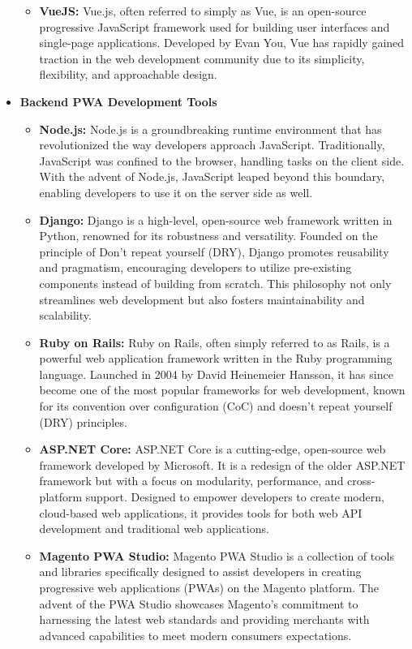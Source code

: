 \documentclass[12pt]{article}
\begin{document}
\begin{itemize}
\begin{itemize}
            \item \textbf{VueJS:} Vue.js, often referred to simply as Vue, is an open-source progressive JavaScript framework used for building user interfaces and single-page applications. Developed by Evan You, Vue has rapidly gained traction in the web development community due to its simplicity, flexibility, and approachable design.
        \end{itemize}
    \item \textbf{Backend PWA Development Tools}
        \begin{itemize}
            \item \textbf{Node.js:} Node.js is a groundbreaking runtime environment that has revolutionized the way developers approach JavaScript. Traditionally, JavaScript was confined to the browser, handling tasks on the client side. With the advent of Node.js, JavaScript leaped beyond this boundary, enabling developers to use it on the server side as well.
            \item \textbf{Django:} Django is a high-level, open-source web framework written in Python, renowned for its robustness and versatility. Founded on the principle of Don’t repeat yourself (DRY), Django promotes reusability and pragmatism, encouraging developers to utilize pre-existing components instead of building from scratch. This philosophy not only streamlines web development but also fosters maintainability and scalability.
            \item \textbf{Ruby on Rails:} Ruby on Rails, often simply referred to as Rails, is a powerful web application framework written in the Ruby programming language. Launched in 2004 by David Heinemeier Hansson, it has since become one of the most popular frameworks for web development, known for its convention over configuration (CoC) and doesn’t repeat yourself (DRY) principles.
            \item \textbf{ASP.NET Core:} ASP.NET Core is a cutting-edge, open-source web framework developed by Microsoft. It is a redesign of the older ASP.NET framework but with a focus on modularity, performance, and cross-platform support. Designed to empower developers to create modern, cloud-based web applications, it provides tools for both web API development and traditional web applications.
            \item \textbf{Magento PWA Studio:} Magento PWA Studio is a collection of tools and libraries specifically designed to assist developers in creating progressive web applications (PWAs) on the Magento platform. The advent of the PWA Studio showcases Magento’s commitment to harnessing the latest web standards and providing merchants with advanced capabilities to meet modern consumers expectations.
        \end{itemize}
\end{itemize}
\citep{pwa}
\end{document}
